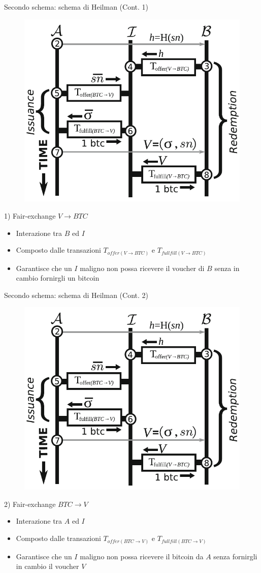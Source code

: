 \documentclass{beamer}
\begin{document}
  
  
  
  \begin{frame}{Secondo schema: schema di Heilman (Cont. 1)}
      \begin{figure}
          \centering
          \includegraphics[width=0.4\linewidth]{../img/heilman-scheme.png}
      \end{figure}
      \begin{block}{1) Fair-exchange $V\rightarrow BTC$}
        \begin{itemize}
            \item Interazione tra $B$ ed $I$
            \item Composto dalle transazioni $T_{offer(V\rightarrow BTC)}$ e $T_{fullfill(V\rightarrow BTC)}$
            \item Garantisce che un $I$ maligno non possa ricevere il voucher di $B$ senza in cambio fornirgli un bitcoin
        \end{itemize}
      \end{block}
  \end{frame}
  
  
  
  
  \begin{frame}{Secondo schema: schema di Heilman (Cont. 2)}
      \begin{figure}
          \centering
          \includegraphics[width=0.4\linewidth]{../img/heilman-scheme.png}
      \end{figure}
      \begin{block}{2) Fair-exchange $BTC\rightarrow V$}
        \begin{itemize}
            \item Interazione tra $A$ ed $I$
            \item Composto dalle transazioni $T_{offer(BTC\rightarrow V)}$ e $T_{fullfill(BTC\rightarrow V)}$
            \item Garantisce che un $I$ maligno non possa ricevere il bitcoin da $A$ senza fornirgli in cambio il voucher $V$
        \end{itemize}
      \end{block}
  \end{frame}
  
\end{document}
